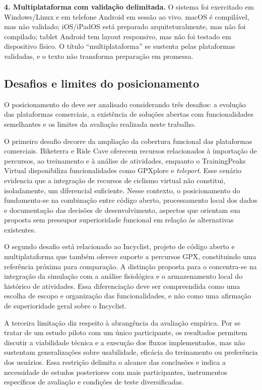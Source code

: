 \textbf{4. Multiplataforma com validação delimitada.} O sistema foi exercitado
em Windows/Linux e em telefone Android em sessão ao vivo. macOS é compilável,
mas não validado;
iOS/iPadOS está preparado arquiteturalmente, mas não foi compilado; tablet
Android tem layout responsivo, mas não foi testado em dispositivo físico. O
título ``multiplataforma'' se sustenta pelas plataformas validadas, e o texto
não transforma preparação em promessa.

\subsection{Desafios e limites do posicionamento}
\label{sec:desafios}

O posicionamento do \argus{} deve ser analisado considerando três desafios: a
evolução das plataformas comerciais, a existência de soluções abertas com
funcionalidades semelhantes e os limites da avaliação realizada neste trabalho.

O primeiro desafio decorre da ampliação da cobertura funcional das plataformas
comerciais. Biketerra e Ride Cave oferecem recursos relacionados à importação
de percursos, ao treinamento e à análise de atividades, enquanto o
TrainingPeaks Virtual disponibiliza funcionalidades como GPXplore e
\textit{teleport}. Esse cenário evidencia que a integração de recursos de
ciclismo virtual não constitui, isoladamente, um diferencial suficiente. Nesse
contexto, o posicionamento do \argus{} fundamenta-se na combinação entre código
aberto, processamento local dos dados e documentação das decisões de
desenvolvimento, aspectos que orientam sua proposta sem pressupor superioridade
funcional em relação às alternativas existentes.

O segundo desafio está relacionado ao Incyclist, projeto de código aberto e
multiplataforma que também oferece suporte a percursos GPX, constituindo uma
referência próxima para comparação. A distinção proposta para o \argus{}
concentra-se na integração da simulação com a análise fisiológica e o
armazenamento local do histórico de atividades. Essa diferenciação deve ser
compreendida como uma escolha de escopo e organização das funcionalidades, e
não como uma afirmação de superioridade geral sobre o Incyclist.

A terceira limitação diz respeito à abrangência da avaliação empírica. Por se
tratar de um estudo piloto com um único participante, os resultados permitem
discutir a viabilidade técnica e a execução dos fluxos implementados, mas não
sustentam generalizações sobre usabilidade, eficácia do treinamento ou
preferência dos usuários. Essa restrição delimita o alcance das conclusões e
indica a necessidade de estudos posteriores com mais participantes,
instrumentos específicos de avaliação e condições de teste diversificadas.

